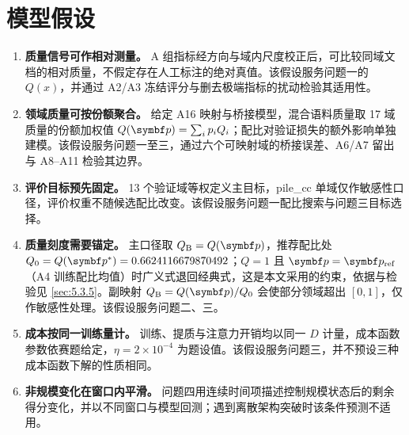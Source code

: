 \section{模型假设}
\label{sec:3}

\begin{enumerate}
\item \textbf{质量信号可作相对测量。} A 组指标经方向与域内尺度校正后，可比较同域文档的相对质量，不假定存在人工标注的绝对真值。该假设服务问题一的 $Q(x)$，并通过 A2/A3 冻结评分与删去极端指标的扰动检验其适用性。
\item \textbf{领域质量可按份额聚合。} 给定 A16 映射与桥接模型，混合语料质量取 17 域质量的份额加权值 $Q(\bp)=\sum_i p_iQ_i$；配比对验证损失的额外影响单独建模。该假设服务问题一至三，通过六个可映射域的桥接误差、A6/A7 留出与 A8–A11 检验其边界。
\item \textbf{评价目标预先固定。} 13 个验证域等权定义主目标，pile\_cc 单域仅作敏感性口径，评价权重不随候选配比改变。该假设服务问题一配比搜索与问题三目标选择。
\item \textbf{质量刻度需要锚定。} 主口径取 $Q_{\rm B}=Q(\bp)$，推荐配比处 $Q_0=Q(\bp^*)=0.6624116679870492$；$Q=1$ 且 $\bp=\bp_{\rm ref}$（A4 训练配比均值）时广义式退回经典式，这是本文采用的约束，依据与检验见 \ref{sec:5.3.5}。副映射 $Q_{\rm B}=Q(\bp)/Q_0$ 会使部分领域超出 $[0,1]$，仅作敏感性处理。该假设服务问题二、三。
\item \textbf{成本按同一训练量计。} 训练、提质与注意力开销均以同一 $D$ 计量，成本函数参数依赛题给定，$\eta=2\times10^{-4}$ 为题设值。该假设服务问题三，并不预设三种成本函数下解的性质相同。
\item \textbf{非规模变化在窗口内平滑。} 问题四用连续时间项描述控制规模状态后的剩余得分变化，并以不同窗口与模型回测；遇到离散架构突破时该条件预测不适用。
\end{enumerate}
